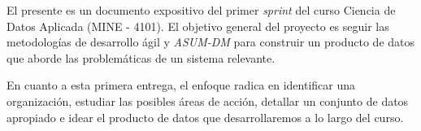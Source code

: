\label{chapter:introduction}

El presente es un documento expositivo del primer \textit{sprint} del curso Ciencia de Datos Aplicada (MINE - 4101).
El objetivo general del proyecto es seguir las metodologías de desarrollo ágil y \textit{ASUM-DM} para construir un producto de datos que aborde las problemáticas de un sistema relevante.

En cuanto a esta primera entrega, el enfoque radica en identificar una organización, estudiar las posibles áreas de acción, detallar un conjunto de datos apropiado e idear el producto de datos que desarrollaremos a lo largo del curso.

